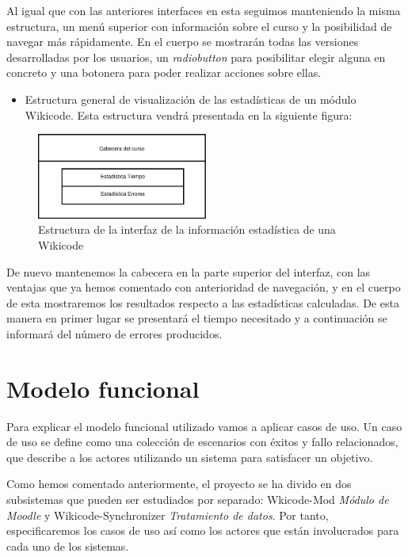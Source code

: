 Al igual que con las anteriores interfaces en esta seguimos manteniendo la misma estructura, un menú superior con información sobre el curso y la posibilidad de navegar más rápidamente. En el cuerpo se mostrarán todas las versiones desarrolladas por los usuarios, un \emph{radiobutton} para posibilitar elegir alguna en concreto y una botonera para poder realizar acciones sobre ellas.

\begin{itemize}
	\item Estructura general de visualización de las estadísticas de un módulo Wikicode. Esta estructura vendrá presentada en la siguiente figura:
\end{itemize}

\begin{figure}[h]
	\centering
	\includegraphics[width=0.5\textwidth]{./img/c3-logs.eps}
	\caption{Estructura de la interfaz de la información estadística de una Wikicode}
\end{figure}

De nuevo mantenemos la cabecera en la parte superior del interfaz, con las ventajas que ya hemos comentado con anterioridad de navegación, y en el cuerpo de esta mostraremos los resultados respecto a las estadísticas calculadas. De esta manera en primer lugar se presentará el tiempo necesitado y a continuación se informará del número de errores producidos. 

\section{Modelo funcional}

Para explicar el modelo funcional utilizado vamos a aplicar casos de uso. Un caso de uso se define como una colección de escenarios con éxitos y fallo relacionados, que describe a los actores utilizando un sistema para satisfacer un objetivo. 

Como hemos comentado anteriormente, el proyecto se ha divido en dos subsistemas que pueden ser estudiados por separado: Wkicode-Mod \emph{Módulo de Moodle} y Wikicode-Synchronizer \emph{Tratamiento de datos}. Por tanto, especificaremos los casos de uso así como los actores que están involucrados para cada uno de los sistemas.

